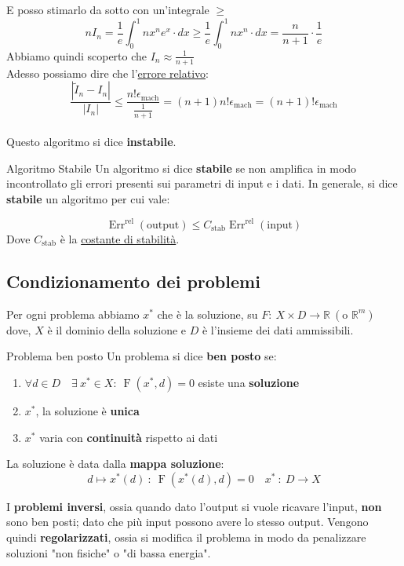 \documentclass{article}
\begin{document}
E posso stimarlo da sotto con un'integrale $\ge$
\[nI_n=\frac{1}{e}\int_{0}^{1}nx^ne^x\cdot dx \ge \frac{1}{e}\int_{0}^{1}nx^n\cdot dx=\frac{n}{n+1}\cdot\frac{1}{e}\]
Abbiamo quindi scoperto che $I_n \approx \frac{1}{n+1}$\\
Adesso possiamo dire che l'\underline{errore relativo}:
\[\frac{|\widetilde{I}_n-I_n|}{|I_n|}\le \frac{n!\epsilon_{\mathrm{mach}}}{\frac{1}{n+1}}=(n+1)n!\epsilon_{\mathrm{mach}}=\boxed{(n+1)!\epsilon_{\mathrm{mach}}}\]\\
Questo algoritmo si dice \textbf{instabile}.\\

\begin{defi}{Algoritmo Stabile}{}
    Un algoritmo si dice \textbf{stabile} se non amplifica in modo incontrollato gli errori presenti sui
    parametri di input e i dati. In generale, si dice \textbf{stabile} un algoritmo per cui vale:

    \[
        \operatorname{Err}^{\mathrm{rel}}(\text{output})\le C_{\mathrm{stab}}\operatorname{Err}^{\mathrm{rel}}(\text{input})
    \]
    Dove $C_{\mathrm{stab}}$ è la \underline{costante di stabilità}.
\end{defi}

\subsection{Condizionamento dei problemi}

Per ogni problema abbiamo $x^*$ che è la soluzione, su $F:\ X\times D\to\mathbb{R}\ (\text{o }\mathbb{R}^m)$ dove, $X$ è il dominio della soluzione
e $D$ è l'insieme dei dati ammissibili.
\begin{defi}{Problema ben posto}{}
    Un problema si dice \textbf{ben posto} se:
    \begin{enumerate}
        \item \(\forall d\in D\quad\exists\ x^*\in X:\ \operatorname{F}(x^*,d)=0\) esiste una \textbf{soluzione}
        \item \(x^*\), la soluzione è \textbf{unica}
        \item $x^*$ varia con \textbf{continuità} rispetto ai dati\\
    \end{enumerate}
    La soluzione è data dalla \textbf{mappa soluzione}:\[d\mapsto x^*(d)\ :\ \operatorname{F}(x^*(d),d)=0\quad x^*\ :\ D\to X\]
\end{defi}
I \textbf{problemi inversi}, ossia quando dato l'output si vuole ricavare l'input, \textbf{non} sono ben posti; dato che più input possono avere lo stesso output.
Vengono quindi \textbf{regolarizzati}, ossia si modifica il problema in modo da penalizzare soluzioni "non fisiche" o "di bassa energia".
\end{document}
